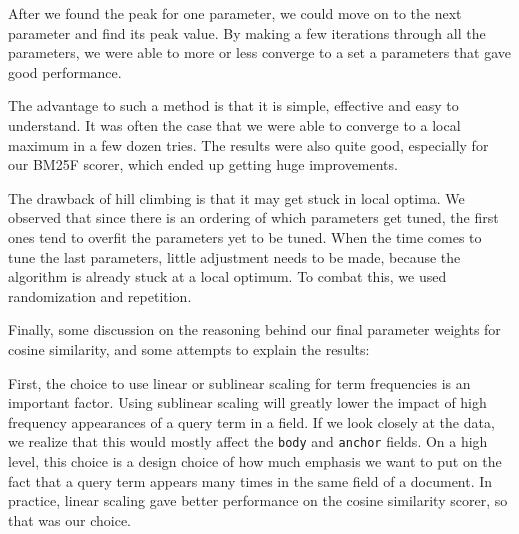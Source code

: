 \documentclass[10pt,twocolumn]{article}
\begin{document}
After we found the peak for one parameter, we could move on to the next parameter and find its peak value. By making a few iterations through all the parameters, we were able to more or less converge to a set a parameters that gave good performance.

The advantage to such a method is that it is simple, effective and easy to understand. It was often the case that we were able to converge to a local maximum in a few dozen tries. The results were also quite good, especially for our BM25F scorer, which ended up getting huge improvements.

The drawback of hill climbing is that it may get stuck in local optima. We observed that since there is an ordering of which parameters get tuned, the first ones tend to overfit the parameters yet to be tuned. When the time comes to tune the last parameters, little adjustment needs to be made, because the algorithm is already stuck at a local optimum. To combat this, we used randomization and repetition.

Finally, some discussion on the reasoning behind our final parameter weights for cosine similarity, and some attempts to explain the results:

First, the choice to use linear or sublinear scaling for term frequencies is an important factor. Using sublinear scaling will greatly lower the impact of high frequency appearances of a query term in a field. If we look closely at the data, we realize that this would mostly affect the \texttt{body} and \texttt{anchor} fields. On a high level, this choice is a design choice of how much emphasis we want to put on the fact that a query term appears many times in the same field of a document. In practice, linear scaling gave better performance on the cosine similarity scorer, so that was our choice.
\end{document}
